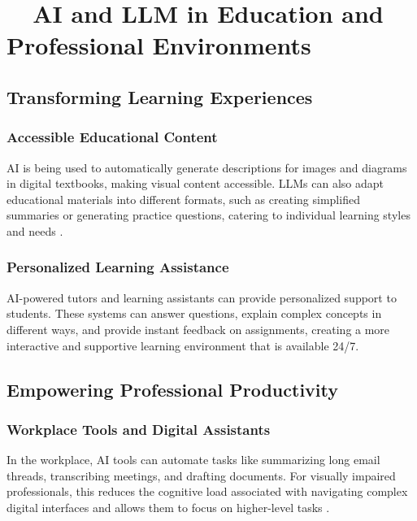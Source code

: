 \section{~~AI and LLM in Education and Professional Environments}\label{ch9:sec:education-professional}

\subsection{Transforming Learning Experiences}\label{ch9:ssec:learning-experiences}

\subsubsection{Accessible Educational Content}\label{ch9:sssec:accessible-content}
AI is being used to automatically generate descriptions for images and diagrams in digital textbooks, making visual content accessible. LLMs can also adapt educational materials into different formats, such as creating simplified summaries or generating practice questions, catering to individual learning styles and needs \supercite{Bigham2014, MicrosoftAIAccessibility, GoogleMLAccessibility}.

\subsubsection{Personalized Learning Assistance}\label{ch9:sssec:personalized-learning}
AI-powered tutors and learning assistants can provide personalized support to students. These systems can answer questions, explain complex concepts in different ways, and provide instant feedback on assignments, creating a more interactive and supportive learning environment that is available 24/7.

\subsection{Empowering Professional Productivity}\label{ch9:ssec:professional-productivity}

\subsubsection{Workplace Tools and Digital Assistants}\label{ch9:sssec:workplace-tools}
In the workplace, AI tools can automate tasks like summarizing long email threads, transcribing meetings, and drafting documents. For visually impaired professionals, this reduces the cognitive load associated with navigating complex digital interfaces and allows them to focus on higher-level tasks \supercite{MicrosoftAccessibility, MicrosoftCopilotFeatures, MicrosoftCopilotTech}.

